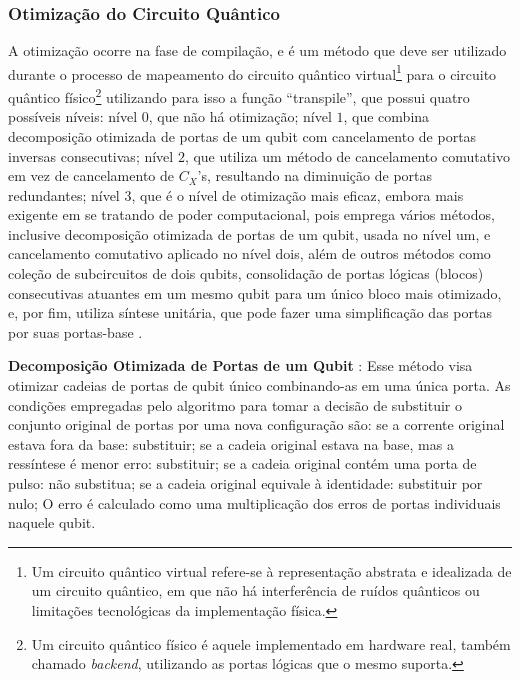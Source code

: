 \subsubsection*{Otimizaç\~{a}o do Circuito Qu\^{a}ntico}
\label{subSubSec: otimizacao}

A otimizaç\~{a}o ocorre na fase de compilaç\~{a}o, e \'{e} um m\'{e}todo que deve ser utilizado durante o processo de mapeamento do circuito qu\^{a}ntico virtual\footnote{Um circuito qu\^{a}ntico virtual refere-se à representaç\~{a}o abstrata e idealizada de um circuito qu\^{a}ntico, em que n\~{a}o h\'{a} interfer\^{e}ncia de ru\'{i}dos qu\^{a}nticos ou limitaç\~{o}es tecnológicas da implementaç\~{a}o f\'{i}sica.} para o circuito qu\^{a}ntico f\'{i}sico\footnote{
Um circuito qu\^{a}ntico f\'{i}sico \'{e} aquele implementado em hardware real, tamb\'{e}m chamado \textit{backend}, utilizando as portas lógicas que o mesmo suporta.
} utilizando para isso a funç\~{a}o “transpile”, que possui quatro poss\'{i}veis n\'{i}veis: n\'{i}vel $0$, que n\~{a}o h\'{a} otimizaç\~{a}o; n\'{i}vel $1$, que combina decomposiç\~{a}o otimizada de portas de um qubit com cancelamento de portas inversas consecutivas; n\'{i}vel $2$, que utiliza um m\'{e}todo de cancelamento comutativo em vez de cancelamento de $C_X$'s, resultando na diminuiç\~{a}o de portas redundantes; n\'{i}vel $3$, que \'{e} o n\'{i}vel de otimizaç\~{a}o mais eficaz, embora mais exigente em se tratando de poder computacional, pois emprega v\'{a}rios m\'{e}todos, inclusive decomposiç\~{a}o otimizada de portas de um qubit, usada no n\'{i}vel um, e cancelamento comutativo aplicado no n\'{i}vel dois, al\'{e}m de outros m\'{e}todos como coleç\~{a}o de subcircuitos de dois qubits, consolidaç\~{a}o de portas lógicas (blocos) consecutivas atuantes em um mesmo qubit para um \'{u}nico bloco mais otimizado, e, por fim, utiliza s\'{i}ntese unit\'{a}ria, que pode fazer uma simplificaç\~{a}o das portas por suas portas-base \cite{IBM2025_transpile}.

\textbf{Decomposiç\~{a}o Otimizada de Portas de um Qubit} \cite{IBM2025_OptimGates1qb}: Esse m\'{e}todo visa otimizar cadeias de portas de qubit \'{u}nico combinando-as em uma \'{u}nica porta. As condiç\~{o}es empregadas pelo algoritmo para tomar a decis\~{a}o de substituir o conjunto original de portas por uma nova configuraç\~{a}o s\~{a}o:
se a corrente original estava fora da base: substituir;
se a cadeia original estava na base, mas a ress\'{i}ntese \'{e} menor erro: substituir;
se a cadeia original cont\'{e}m uma porta de pulso: n\~{a}o substitua;
se a cadeia original equivale à identidade: substituir por nulo;
O erro \'{e} calculado como uma multiplicaç\~{a}o dos erros de portas individuais naquele qubit.

